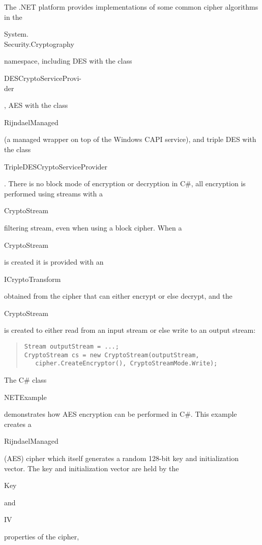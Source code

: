 The .NET platform provides implementations of some common
cipher algorithms in the 
\begin{code}System.\\Security.Cryptography\end{code}
namespace, including DES with the class \begin{code}DESCryptoServiceProvi-\\der\end{code},
AES with the class \begin{code}RijndaelManaged\end{code}
(a managed wrapper on top of the Windows CAPI service),
and triple DES with the class \begin{code}TripleDESCryptoServiceProvider\end{code}.
There is no block mode of encryption or decryption in C\#,
all encryption is performed using streams with a \begin{code}CryptoStream\end{code}
filtering stream, even when using a block cipher.
When a \begin{code}CryptoStream\end{code} is created it is provided with an
\begin{code}ICryptoTransform\end{code} obtained from the cipher
that can either encrypt or else decrypt, and the \begin{code}CryptoStream\end{code}
is created to either read from an input stream or else write to an output stream:
\begin{quote}\begin{code}\begin{verbatim}
Stream outputStream = ...;
CryptoStream cs = new CryptoStream(outputStream,
   cipher.CreateEncryptor(), CryptoStreamMode.Write);
\end{verbatim}\end{code}\end{quote}
The C\# class \begin{code}NETExample\end{code} demonstrates
how AES encryption can be performed in C\#.
This example creates a \begin{code}RijndaelManaged\end{code} (AES) cipher
which itself generates a random 128-bit key and initialization vector.
The key and initialization vector are held by the
\begin{code}Key\end{code} and \begin{code}IV\end{code} properties of the cipher,
